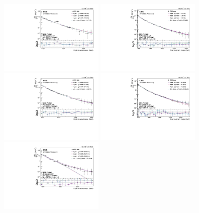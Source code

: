 \begin{figure}[h!]
\centering
\includegraphics[width=0.45\textwidth]{figures/analysis/search2/AN-16-235/plots/WWHP_fitComp.pdf}
\includegraphics[width=0.45\textwidth]{figures/analysis/search2/AN-16-235/plots/WWLP_fitComp.pdf}\\
\includegraphics[width=0.45\textwidth]{figures/analysis/search2/AN-16-235/plots/WZHP_fitComp.pdf}
\includegraphics[width=0.45\textwidth]{figures/analysis/search2/AN-16-235/plots/WZLP_fitComp.pdf}\\
\includegraphics[width=0.45\textwidth]{figures/analysis/search2/AN-16-235/plots/ZZHP_fitComp.pdf}

\end{figure}

